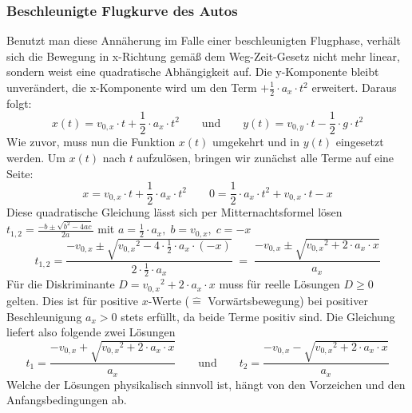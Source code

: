 \subsubsection{Beschleunigte Flugkurve des Autos}
Benutzt man diese Annäherung im Falle einer beschleunigten Flugphase, verhält sich die Bewegung in x-Richtung gemäß dem Weg-Zeit-Gesetz\parencite{WegZeitGesetzWiki} nicht mehr linear, sondern weist eine quadratische Abhängigkeit auf.
Die y-Komponente bleibt unverändert, die x-Komponente wird um den Term $+\frac{1}{2}\cdot a_x\cdot t^2$ erweitert.
Daraus folgt:
\[
x(t) = v_{0,x} \cdot t + \frac{1}{2} \cdot a_x \cdot t^2 \qquad \text{und} \qquad
y(t) = v_{0,y} \cdot t - \frac{1}{2} \cdot g \cdot t^2
\]
Wie zuvor, muss nun die Funktion $x(t)$ umgekehrt und in $y(t)$ eingesetzt werden.
Um $x(t)$ nach $t$ aufzulösen, bringen wir zunächst alle Terme auf eine Seite:
\[
x = v_{0,x} \cdot t + \frac{1}{2} \cdot a_x \cdot t^2 \qquad 0 = \frac{1}{2} \cdot a_x \cdot t^2 + v_{0,x} \cdot t - x
\]
Diese quadratische Gleichung lässt sich per Mitternachtsformel lösen $t_{1,2} = \frac{-b \pm \sqrt{b^2 - 4ac}}{2a}$ mit $a = \tfrac{1}{2} \cdot a_x, \; b = v_{0,x}, \; c = -x$
\[
t_{1,2} = \frac{-v_{0,x} \pm \sqrt{{v_{0,x}}^2 - 4 \cdot \tfrac{1}{2} \cdot a_x \cdot (-x)}}{2 \cdot \tfrac{1}{2} \cdot a_x} \; = \; \frac{-v_{0,x} \pm \sqrt{{v_{0,x}}^2 + 2 \cdot a_x \cdot x}}{a_x}
\]
Für die Diskriminante $D = {v_{0,x}}^2 + 2 \cdot a_x \cdot x$ muss für reelle Lösungen $D \geq 0$ gelten. Dies ist für positive $x$-Werte ($\hat{=}$ Vorwärtsbewegung) bei positiver Beschleunigung $a_x > 0$ stets erfüllt, da beide Terme positiv sind. Die Gleichung liefert also folgende zwei Lösungen
\[
t_1 = \frac{-v_{0,x} + \sqrt{{v_{0,x}}^2 + 2 \cdot a_x \cdot x}}{a_x} \qquad \text{und} \qquad t_2 = \frac{-v_{0,x} - \sqrt{{v_{0,x}}^2 + 2 \cdot a_x \cdot x}}{a_x}
\]
Welche der Lösungen physikalisch sinnvoll ist, hängt von den Vorzeichen und den Anfangsbedingungen ab.
